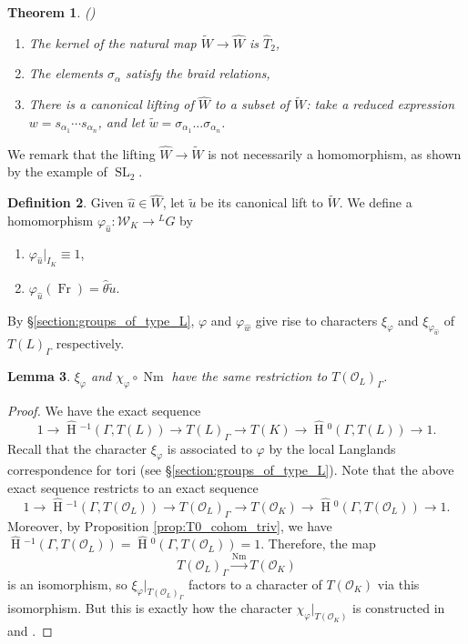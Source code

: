 \documentclass{compositio}
\theoremstyle{plain}
\newtheorem{theorem}{Theorem}[section]
\newtheorem{lemma}[theorem]{Lemma}
\newcommand{\HT}[1]{\hat{\HH}{}^{#1}}
\theoremstyle{definition}
\newtheorem{definition}[theorem]{Definition}
\DeclareMathOperator{\HH}{H}
\DeclareMathOperator{\Nm}{Nm}
\DeclareMathOperator{\Fr}{Fr}
\DeclareMathOperator{\SL}{SL}
\newcommand{\OK}{\mathcal{O}_K}
\newcommand{\OL}{\mathcal{O}_L}
\newcommand{\Weil}{\mathcal{W}}
\begin{document}
\begin{theorem}{(\cite{tits:66a})}
\begin{enumerate}

\item The kernel of the natural map $\widetilde{W} \rightarrow \hat{W}$
  is $\hat{T}_2$,
\item The elements $\sigma_{\alpha}$ satisfy the braid relations,
\item There is a canonical lifting of $\hat{W}$ to a subset of
  $\widetilde{W}$: take a reduced expression $w = s_{\alpha_1} \cdots s_{\alpha_n}$,
  and let $\tilde{w} = \sigma_{\alpha_1} ... \sigma_{\alpha_n}$.
\end{enumerate}
\end{theorem}

We remark that the lifting $\hat{W} \rightarrow \widetilde{W}$ is not necessarily a homomorphism,
as shown by the example of $\SL_2$.

\begin{definition} \label{def:phiu}
Given $\hat{u} \in \hat{W}$, let $\tilde{u}$ be its canonical lift to $\widetilde{W}$.
We define a homomorphism $\varphi_{\hat{u}} : \Weil_K \rightarrow {}^L G$ by
\begin{enumerate}
\item $\varphi_{\hat{u}}|_{I_K} \equiv 1$,
\item $\varphi_{\hat{u}}(\Fr) = \hat{\theta} \tilde{u}$.
\end{enumerate}
\end{definition}

By
\S\ref{section:groups_of_type_L}, $\varphi$ and $\varphi_{\hat{w}}$ give rise to characters
$\xi_{\varphi}$ and $\xi_{\varphi_{\hat{w}}}$ of $T(L)_{\Gamma}$ respectively.

\begin{lemma} \label{lem:GDR_compat}
$\xi_{\varphi}$ and $\chi_{\varphi} \circ \Nm$ have the same restriction to $T(\OL)_{\Gamma}$.
\end{lemma}

\begin{proof}
We have the exact sequence
$$1 \rightarrow \HT{-1}(\Gamma, T(L)) \rightarrow T(L)_{\Gamma} \rightarrow T(K)
  \rightarrow \HT{0}(\Gamma, T(L)) \rightarrow 1.$$
Recall that the character $\xi_{\varphi}$ is associated to $\varphi$ by
the local Langlands correspondence for tori (see \S\ref{section:groups_of_type_L}).
Note that the above exact sequence restricts to an exact sequence
$$1 \rightarrow \HT{-1}(\Gamma, T(\OL)) \rightarrow T(\OL)_{\Gamma}
  \rightarrow T(\OK) \rightarrow \HT{0}(\Gamma, T(\OL)) \rightarrow 1.$$
Moreover, by Proposition \ref{prop:T0_cohom_triv}, we have
$\HT{-1}(\Gamma, T(\OL)) = \HT{0}(\Gamma, T(\OL)) = 1$.
Therefore, the map
$$T(\OL)_{\Gamma} \xrightarrow{\Nm} T(\OK)$$
is an isomorphism, so
$\xi_{\varphi}|_{T(\OL)_{\Gamma}}$ factors to a character of
$T(\OK)$ via this isomorphism.  But this is exactly how the character
$\chi_{\varphi}|_{T(\OK)}$ is constructed in \cite{reeder-debacker:09a} and \cite{reeder:08a}.
\end{proof}
\end{document}
